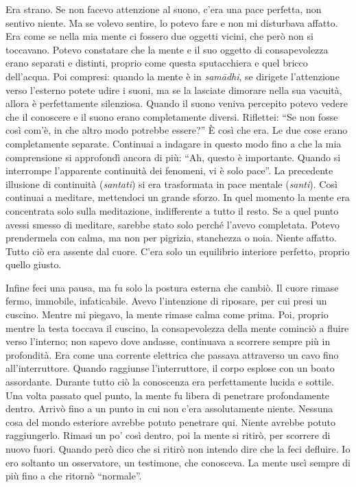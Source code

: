 Era strano. Se non facevo attenzione al suono, c'era una pace perfetta,
non sentivo niente. Ma se volevo sentire, lo potevo fare e non mi
disturbava affatto. Era come se nella mia mente ci fossero due oggetti
vicini, che però non si toccavano. Potevo constatare che la mente e il
suo oggetto di consapevolezza erano separati e distinti, proprio come
questa sputacchiera e quel bricco dell'acqua. Poi compresi: quando la
mente è in \emph{samādhi}, se dirigete l'attenzione verso l'esterno potete
udire i suoni, ma se la lasciate dimorare nella sua vacuità, allora è
perfettamente silenziosa. Quando il suono veniva percepito potevo vedere
che il conoscere e il suono erano completamente diversi. Riflettei: ``Se
non fosse così com'è, in che altro modo potrebbe essere?'' È così che
era. Le due cose erano completamente separate. Continuai a indagare in
questo modo fino a che la mia comprensione si approfondì ancora di più:
``Ah, questo è importante. Quando si interrompe l'apparente continuità
dei fenomeni, vi è solo pace''. La precedente illusione di continuità
(\emph{santati}) si era trasformata in pace mentale (\emph{santi}). Così
continuai a meditare, mettendoci un grande sforzo. In quel momento la
mente era concentrata solo sulla meditazione, indifferente a tutto il
resto. Se a quel punto avessi smesso di meditare, sarebbe stato solo
perché l'avevo completata. Potevo prendermela con calma, ma non per
pigrizia, stanchezza o noia. Niente affatto. Tutto ciò era assente dal
cuore. C'era solo un equilibrio interiore perfetto, proprio quello
giusto.

Infine feci una pausa, ma fu solo la postura esterna che cambiò. Il
cuore rimase fermo, immobile, infaticabile. Avevo l'intenzione di
riposare, per cui presi un cuscino. Mentre mi piegavo, la mente rimase
calma come prima. Poi, proprio mentre la testa toccava il cuscino, la
consapevolezza della mente cominciò a fluire verso l'interno; non sapevo
dove andasse, continuava a scorrere sempre più in profondità. Era come
una corrente elettrica che passava attraverso un cavo fino
all'interruttore. Quando raggiunse l'interruttore, il corpo esplose con
un boato assordante. Durante tutto ciò la conoscenza era perfettamente
lucida e sottile. Una volta passato quel punto, la mente fu libera di
penetrare profondamente dentro. Arrivò fino a un punto in cui non c'era
assolutamente niente. Nessuna cosa del mondo esteriore avrebbe potuto
penetrare qui. Niente avrebbe potuto raggiungerlo. Rimasi un po' così
dentro, poi la mente si ritirò, per scorrere di nuovo fuori. Quando però
dico che si ritirò non intendo dire che la feci defluire. Io ero
soltanto un osservatore, un testimone, che conosceva. La mente uscì
sempre di più fino a che ritornò ``normale''.


